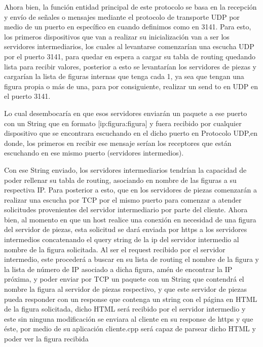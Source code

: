 \documentclass[a4paper,10pt]{article}
\begin{document}
	Ahora bien, la función entidad principal de este protocolo se basa en la recepción y envío de señales o
	mensajes mediante el protocolo de transporte UDP por medio de un puerto en específico en cuando
	definimos como en 3141.
	Para esto, los primeros dispositivos que van a realizar su inicialización van a ser los servidores
	intermediarios, los cuales al levantarse comenzarían una escucha UDP por el puerto 3141, para quedar
	en espera a cargar su tabla de routing quedando lista para recibir valores, posterior a esto se levantarían
	los servidores de piezas y cargarían la lista de figuras internas que tenga cada 1, ya sea que tengan una
	figura propia o más de una, para por consiguiente, realizar un send to en UDP en el puerto 3141.
	
	Lo cual desembocaría en que esos servidores enviarán un paquete a ese puerto con un String que en
	formato [ip:figura:figura] y fuera recibido por cualquier dispositivo que se encontrara escuchando en el
	dicho puerto en Protocolo UDP,en donde, los primeros en recibir ese mensaje serían los receptores que están escuchando en ese mismo
	puerto (servidores intermedios).
	
	Con ese String enviado, los servidores intermediarios tendrían la capacidad de poder rellenar su tabla de
	routing, asociando en nombre de las figuras a su respectiva IP. Para posterior a esto, que en los
	servidores de piezas comenzarán a realizar una escucha por TCP por el mismo puerto para comenzar a
	atender solicitudes provenientes del servidor intermediario por parte del cliente.
	Ahora bien, al momento en que un host realice una conexión en necesidad de una figura del servidor de
	piezas, esta solicitud se dará enviada por https a los servidores intermedios concatenando el query
	string de la ip del servidor intermedio al nombre de la figura solicitada.
	Al ser el request recibido por el servidor intermedio, este procederá a buscar en su lista de routing el
	nombre de la figura y la lista de número de IP asociado a dicha figura, amén de encontrar la IP próxima, y
	poder enviar por TCP un paquete con un String que contendrá el nombre la figura al servidor de piezas
	respectivo, y que este servidor de piezas pueda responder con un response que contenga un string con
	el página en HTML de la figura solicitada, dicho HTML será recibido por el servidor intermedio y este sin
	ninguna modificación se enviara al cliente en su response de https y que éste, por medio de su aplicación
	cliente.cpp será capaz de parsear dicho HTML y poder ver la figura recibida
\end{document}
